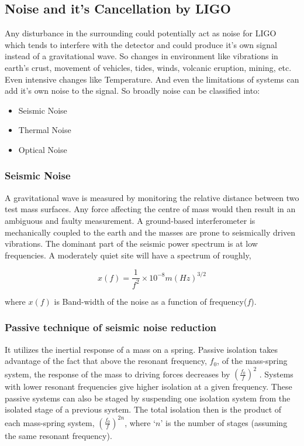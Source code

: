 \subsection{Noise and it's Cancellation by LIGO}

Any disturbance in the surrounding could potentially act as noise for LIGO which tends to interfere with the detector and could produce it's own signal instead of a gravitational wave. So changes in environment like vibrations in earth's crust, movement of vehicles, tides, winds, volcanic eruption, mining, etc. Even intensive changes like Temperature. And even the limitations of systems can add it's own noise to the signal. So broadly noise can be classified into:

\begin{itemize}
    \item Seismic Noise
    \item Thermal Noise
    \item Optical Noise
\end{itemize}

\subsubsection{Seismic Noise}

A gravitational wave is measured by monitoring the relative distance between two test mass surfaces. Any force affecting the centre of mass would then result in an ambiguous and faulty measurement. A ground-based interferometer is mechanically coupled to the earth and the masses are prone to seismically driven vibrations. The dominant part of the seismic power spectrum is at low frequencies. A moderately quiet site will have a spectrum of roughly,

\begin{equation}
    x(f) = \frac{1}{f^2} \times 10^{-8}m(Hz)^{3/2}
\end{equation}

where $x(f)$ is Band-width of the noise as a function of frequency($f$).


\subsubsection*{Passive technique of seismic noise reduction} 
    
It utilizes the inertial response of a mass on a spring. Passive isolation takes advantage of the fact that above the resonant frequency, $f_0$, of the mass-spring system, the response of the mass to driving forces decreases by $(\frac{f_0}{f})^2$ . Systems with lower resonant frequencies give higher isolation at a given frequency. These passive systems can also be staged by suspending one isolation system from the isolated stage of a previous system. The total isolation then is the product of each mass-spring system, $(\frac{f_0}{f})^{2n}$, where `$n$' is the number of stages (assuming the same resonant frequency).
    
